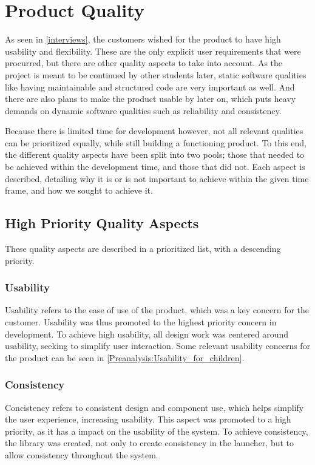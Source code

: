 \section{Product Quality}
\label{product_quality}
As seen in \autoref{interviews}, the customers wished for the product to have high usability and flexibility. 
These are the only explicit user requirements that were procurred, but there are other quality aspects to take into account. 
As the project is meant to be continued by other students later, static software qualities like having maintainable and structured code are very important as well. 
And there are also plans to make the product usable by \autists[] later on, which puts heavy demands on dynamic software qualities such as reliability and consistency. \newline

Because there is limited time for development however, not all relevant qualities can be prioritized equally, while still building a functioning product. 
To this end, the different quality aspects have been split into two pools; those that needed to be achieved within the development time, and those that did not. 
Each aspect is described, detailing why it is or is not important to achieve within the given time frame, and how we sought to achieve it. 

\subsection{High Priority Quality Aspects}
These quality aspects are described in a prioritized list, with a descending priority. 

\subsubsection{Usability}
Usability refers to the ease of use of the product, which was a key concern for the customer.
Usability was thus promoted to the highest priority concern in development. 
To achieve high usability, all design work was centered around usability, seeking to simplify user interaction. 
Some relevant usability concerns for the product can be seen in \autoref{Preanalysis:Usability_for_children}.

\subsubsection{Consistency}
Concistency refers to consistent design and component use, which helps simplify the user experience, increasing usability\citep[page 90]{dieb-book}. 
This aspect was promoted to a high priority, as it has a impact on the usability of the system. 
To achieve consistency, the \guicomponents[] library was created, not only to create consistency in the launcher, but to allow consistency throughout the system. 

